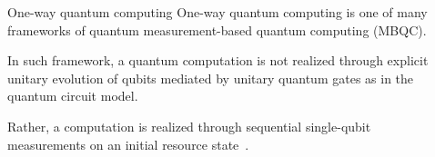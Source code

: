 \documentclass[final]{beamer}
\newlength{\sepwidth}
\newlength{\colwidth}
\newcommand{\separatorcolumn}{\begin{column}{\sepwidth}\end{column}}
\begin{document}
    \begin{frame}[t]
        \begin{columns}[t]
            \separatorcolumn

            \begin{column}{\colwidth}
                \begin{block}{One-way quantum computing}
                    One-way quantum computing is one of many frameworks of quantum
                    measurement-based quantum computing (MBQC).

                    In such framework, a quantum computation is not realized through explicit
                    unitary evolution of qubits mediated by unitary quantum gates as in the
                    quantum circuit model.

                    Rather, a computation is realized through sequential single-qubit
                    measurements on an initial resource
                    state~\cite{PhysRevA.68.022312}.

                    \begin{figure}[H]
                        \centering
\end{figure}
\end{block}
\end{column}
\end{columns}
\end{frame}
\end{document}
